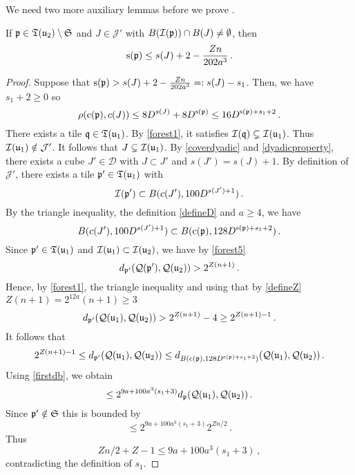     We need two more auxiliary lemmas before we prove .

    \begin{lemma}
        \label{thin-scale-impact}
        \leanok
        If ${\mathfrak p} \in {\mathfrak T}({\mathfrak u}_2) \setminus \mathfrak{S}$ and $J \in \mathcal{J'}$ with $B({\mathcal{I}}({\mathfrak p})) \cap B(J) \ne \emptyset$, then
        $$
            {\mathrm{s}}({\mathfrak p}) \le s(J) + 2 - \frac{Zn}{202a^3}\,.
        $$
    \end{lemma}

    \begin{proof}
        \leanok
        Suppose that ${\mathrm{s}}({\mathfrak p}) > s(J) + 2 -\frac{Zn}{202a^3} =: s(J) - s_1$. Then, we have $s_1 + 2 \ge 0$ so
        $$
            \rho({\mathrm{c}}({\mathfrak p}), c(J)) \le 8D^{s(J)}+8D^{{\mathrm{s}}({\mathfrak p})} \le 16 D^{{\mathrm{s}}({\mathfrak p}) + s_1 + 2}\,.
        $$
        There exists a tile ${\mathfrak q} \in {\mathfrak T}({\mathfrak u}_1)$. By \eqref{forest1}, it satisfies ${\mathcal{I}}({\mathfrak q}) \subsetneq {\mathcal{I}}({\mathfrak u}_1)$. Thus ${\mathcal{I}}({\mathfrak u}_1) \notin \mathcal{J}'$. It follows that $J \subsetneq {\mathcal{I}}({\mathfrak u}_1)$. By \eqref{coverdyadic} and \eqref{dyadicproperty}, there exists a cube $J' \in \mathcal{D}$ with $J \subset J'$ and $s(J') = s(J) + 1$. By definition of $\mathcal{J}'$, there exists a tile ${\mathfrak p}' \in {\mathfrak T}({\mathfrak u}_1)$ with
        $$
            {\mathcal{I}}({\mathfrak p}') \subset B(c(J'), 100 D^{s(J') + 1})\,.
        $$
        By the triangle inequality, the definition \eqref{defineD} and $a \ge 4$, we have
        $$
            B(c(J'), 100 D^{s(J')+1}) \subset B({\mathrm{c}}({\mathfrak p}), 128 D^{{\mathrm{s}}({\mathfrak p}) + s_1 + 2})\,.
        $$
        Since ${\mathfrak p}' \in {\mathfrak T}({\mathfrak u}_1)$ and ${\mathcal{I}}({\mathfrak u}_1) \subset {\mathcal{I}}({\mathfrak u}_2)$, we have by \eqref{forest5}
        $$
            d_{{\mathfrak p}'}({\mathcal{Q}}({\mathfrak p}'), {\mathcal{Q}}({\mathfrak u}_2)) > 2^{Z(n+1)}\,.
        $$
        Hence, by \eqref{forest1}, the triangle inequality and using that by \eqref{defineZ} $Z(n+1) = 2^{12a}(n+1) \ge 3$
        $$
            d_{{\mathfrak p}'}({\mathcal{Q}}({\mathfrak u}_1), {\mathcal{Q}}({\mathfrak u}_2)) > 2^{Z(n+1)} - 4 \ge 2^{Z(n+1) - 1}\,.
        $$
        It follows that
        $$
            2^{Z(n+1)-1} \le d_{{\mathfrak p}'}({\mathcal{Q}}({\mathfrak u}_1), {\mathcal{Q}}({\mathfrak u}_2)) \le d_{B({\mathrm{c}}({\mathfrak p}), 128 D^{{\mathrm{s}}({\mathfrak p}) + s_1+ 2})}({\mathcal{Q}}({\mathfrak u}_1), {\mathcal{Q}}({\mathfrak u}_2))\,.
        $$
        Using \eqref{firstdb}, we obtain
        $$
            \le 2^{9a + 100a^3 (s_1+3)} d_{{\mathfrak p}}({\mathcal{Q}}({\mathfrak u}_1), {\mathcal{Q}}({\mathfrak u}_2))\,.
        $$
        Since ${\mathfrak p}' \notin \mathfrak{S}$ this is bounded by
        $$
            \le 2^{9a + 100a^3 (s_1+3)} 2^{Zn/2}\,.
        $$
        Thus
        $$
            Z n/2 + Z - 1 \le 9a + 100a^3(s_1 + 3)\,,
        $$
        contradicting the definition of $s_1$.
    \end{proof}

